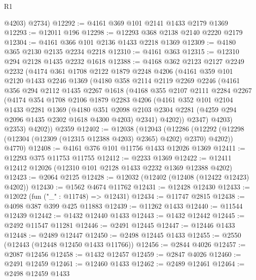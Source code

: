\begin{lexlean}{R1}
\begin{coremodule}
        @4203)
      @2734)
@12292 := @4161 @369 @101 @2141 @1433 @2179 @1369
@12293 := @12011 @196
@12298 := @12293 @368 @2138 @2140 @2220 @2179
@12304 := @4161 @366 @101 @2136 @1433 @2218 @1369
@12309 := @4180 @365 @2130 @2135 @2234 @2218
@12310 := @4161 @363
@12315 := @12310 @294 @2128 @1435 @2232 @1618
@12388 := @4168
    @362
    @2123
    @2127
    @2249
    @2232
    (@4174
      @361
      @1708
      @2122
      @1879
      @2248
      @4206
      (@4161
        @359
        @101
        @2120
        @1433
        @2246
        @1369
        (@4180
          @358
          @2114
          @2119
          @2269
          @2246
          (@4161
            @356
            @294
            @2112
            @1435
            @2267
            @1618
            (@4168
              @355
              @2107
              @2111
              @2284
              @2267
              (@4174
                @354
                @1708
                @2106
                @1879
                @2283
                @4206
                (@4161
                  @352
                  @101
                  @2104
                  @1433
                  @2281
                  @1369
                  (@4180
                    @351
                    @2098
                    @2103
                    @2304
                    @2281
                    (@4259 @294 @2096 @1435 @2302 @1618 @4300 @4203)
                    @2341)
                  @4202))
              @2347)
            @4203)
          @2353)
        @4202))
    @2359
@12402 := @12038
    (@12043
      (@12286 (@12292 (@12298 (@12304 (@12309 (@12315 @12388 @4203) @2365) @4202) @2370) @4202))
      @4770)
@12408 := @4161 @376 @101 @11756 @1433 @12026 @1369
@12411 := @12293 @375 @11753 @11755
@12412 := @2233 @1369
@12422 := @12411 @12412 @12026 (@12310 @101 @2128 @1433 @2232 @1369 @12388 @4202)
@12423 := @2064 @2125
@12428 := @12032 (@12402 (@12408 (@12422 @12423) @4202))
@12430 := @1562 @4674 @11762
@12431 := @12428 @12430
@12433 := @12022 (fun ("_" : @11748) => @12431)
@12434 := @11747 @2815
@12438 := @4098 @387 @399 @425 @11883
@12439 := @11262 @1433
@12440 := @11544 @12439
@12442 := @1432 @12440 @1433
@12443 := @1432 @12442
@12445 := @2492 @11547 @11281
@12446 := @2491 @12445
@12447 := @12446 @1433
@12448 := @2489 @12447
@12450 := @2498 @12445 @1433
@12455 := @2550 (@12443 (@12448 @12450 @1433 @11766))
@12456 := @2844 @4026
@12457 := @2087 @12456
@12458 := @1432 @12457
@12459 := @2847 @4026
@12460 := @2491 @12459
@12461 := @12460 @1433
@12462 := @2489 @12461
@12464 := @2498 @12459 @1433

\end{coremodule}
\end{lexlean}
